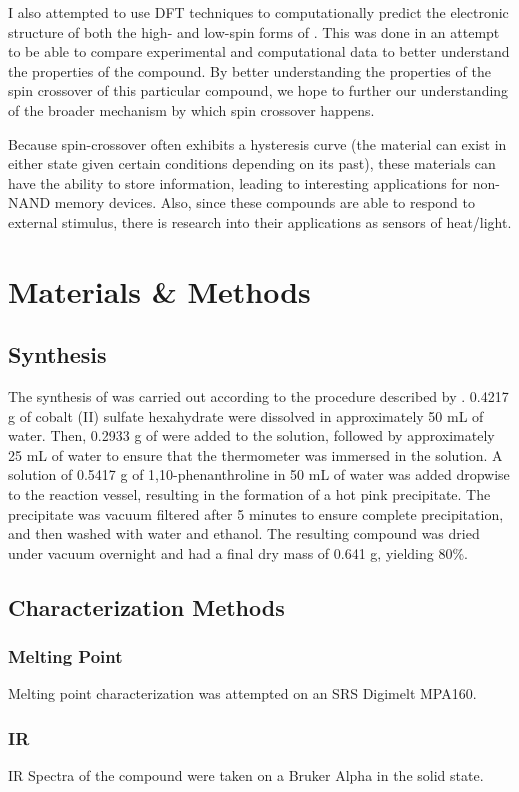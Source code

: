 \documentclass[journal=jacsat,manuscript=communication]{achemso}
\newcommand*\compound{\ch{Co(phen)2(NCS)2} }
\begin{document}
I also attempted to use DFT techniques to computationally predict the electronic structure of both the high- and low-spin forms of \compound.  This was done in an attempt to be able to compare experimental and computational data to better understand the properties of the compound.  By better understanding the properties of the spin crossover of this particular compound, we hope to further our understanding of the broader mechanism by which spin crossover happens. 

Because spin-crossover often exhibits a hysteresis curve (the material can exist in either state given certain conditions depending on its past), these materials can have the ability to store information, leading to interesting applications for non-NAND memory devices.  Also, since these compounds are able to respond to external stimulus, there is research into their applications as sensors of heat/light.


\section{Materials \& Methods}

\subsection{Synthesis}
The synthesis of \compound was carried out according to the procedure described by \citeauthor{Synthesis}. 0.4217 g of cobalt (II) sulfate hexahydrate were dissolved in approximately 50 mL of water. Then, 0.2933 g of  were added to the solution, followed by approximately 25 mL of water to ensure that the thermometer was immersed in the solution. A solution of 0.5417 g of 1,10-phenanthroline in 50 mL of water was added dropwise to the reaction vessel, resulting in the formation of a hot pink precipitate. The precipitate was vacuum filtered after 5 minutes to ensure complete precipitation, and then washed with water and ethanol. The resulting compound was dried under vacuum overnight and had a final dry mass of 0.641 g, yielding 80\%.  
\subsection{Characterization Methods}
\subsubsection{Melting Point}
Melting point characterization was attempted on an SRS Digimelt MPA160.
\subsubsection{IR}
IR Spectra of the compound were taken on a Bruker Alpha in the solid state.
\end{document}
